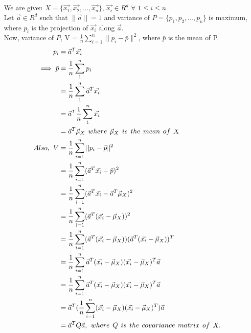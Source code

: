 \documentclass[a4paper,fleqn,11pt]{article}
\theoremstyle{mytheor}
\begin{document}
\section{}
We are given $X =\{\vec{x_{1}},\vec{x_{2}},...,\vec{x_{n}}\}$, $\vec{x_{i}} \in \!R^d$ $\forall$ $1 \leq i \leq n$ \\
Let $\vec{a} \in \!R^d$ such that $\|\vec{a}\| = 1$ and variance of $P = \{p_{1},p_{2},\hdots,p_{n}\}$ is maximum, where $p_{i}$ is the projection of $\vec{x_{i}}$ along $\vec{a}$. \\
Now, variance of $P$, V  = $\frac{1}{n}\sum_{i = 1}^{n} \|p_{i} - \bar{p}\|^2$, where $\bar{p}$ is the mean of P.
\begin{align*}
p_{i} & = \vec{a}^T\vec{x_{i}} \\
\implies \bar{p} & = \frac{1}{n}\sum_{1}^{n} p_{i} \\
& = \frac{1}{n}\sum_{1}^{n} \vec{a}^T\vec{x_{i}} \\
& = \vec{a}^T\frac{1}{n}\sum_{1}^{n} \vec{x_{i}} \\
& = \vec{a}^T \vec{\mu}_{X} \hspace{1ex} where \hspace{1ex} \vec{\mu}_{X} \hspace{1ex} is \hspace{1ex} the \hspace{1ex} mean \hspace{1ex} of \hspace{1ex} X\\
Also, \hspace{1ex} V & = \frac{1}{n}\sum_{i = 1}^{n} \|p_{i} - \bar{p}\|^2 \\
& = \frac{1}{n}\sum_{i = 1}^{n} (\vec{a}^T\vec{x_{i}} - \bar{p})^2 \\
& = \frac{1}{n}\sum_{i = 1}^{n} (\vec{a}^T\vec{x_{i}} - \vec{a}^T \vec{\mu}_{X})^2 \\
& = \frac{1}{n}\sum_{i = 1}^{n} (\vec{a}^T(\vec{x_{i}} - \vec{\mu}_{X}))^2 \\
& = \frac{1}{n}\sum_{i = 1}^{n} (\vec{a}^T(\vec{x_{i}} - \vec{\mu}_{X}))(\vec{a}^T(\vec{x_{i}} - \vec{\mu}_{X}))^T \\
& = \frac{1}{n}\sum_{i = 1}^{n} \vec{a}^T(\vec{x_{i}} - \vec{\mu}_{X})(\vec{x_{i}} - \vec{\mu}_{X})^T\vec{a} \\
& = \frac{1}{n}\sum_{i = 1}^{n} \vec{a}^T(\vec{x_{i}} - \vec{\mu}_{X})(\vec{x_{i}} - \vec{\mu}_{X})^T\vec{a} \\
& = \vec{a}^T(\frac{1}{n}\sum_{i = 1}^{n}(\vec{x_{i}} - \vec{\mu}_{X})(\vec{x_{i}} - \vec{\mu}_{X})^T)\vec{a} \\
& = \vec{a}^T Q\vec{a}, \hspace{1ex} where \hspace{1ex} Q \hspace{1ex} is \hspace{1ex} the \hspace{1ex} covariance \hspace{1ex} matrix \hspace{1ex} of \hspace{1ex} X.
\end{align*}
\end{document}
